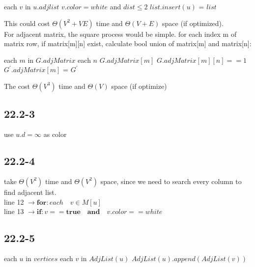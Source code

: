 \documentclass[]{article}
\begin{document}
\begin{codebox}
	
	\li \For each $v$ in $u.adjlist$
	\li 	\Do \If $v.color = white$ and $dist \le 2$ 
	\li			\Then $list.insert(u)$
	\li 		{}
	\End=
	\End
	\li \Return $list$
\end{codebox}

This could cost $\Theta(V^2 + VE)$ time and $\Theta(V+E)$ space (if optimized).\\

For adjacent matrix, the square process would be simple. for each index m of matrix row, if matrix[m][n] exist, calculate bool union of matrix[m] and matrix[n]:

\begin{codebox}
	
	\li \For each $m$ in $G.adjMatrix$
	\li \Do \For each $n$ $G.adjMatrix[m]$
	\li 	\Do \If $G.adjMatrix[m][n] == 1$
	\li         \Then $G^{'}.adjMatrix[m]$ = 
	\End
	\End
	\End
	\li \Return $G^{'}$
\end{codebox}

The  cost $\Theta(V^3)$ time and $\Theta(V)$ space (if optimize)

\subsection{22.2-3}
use $u.d = \infty$ as color

\subsection{22.2-4}
take $\Theta (V^2)$ time and $\Theta (V^2)$ space, since we need to search every column to find adjacent list.\\
line 12 $\rightarrow \textbf{for}: each \quad v \in M[u]$\\
line 13 $\rightarrow \textbf {if}: v == \textbf{true} \quad \textbf{and} \quad v.color == white $

\subsection{22.2-5}

\begin{codebox}
	
	\li \For each $u$ in $vertices$
	\li		\Do \For each $v$ in $AdjList(u)$
	\li 		\Do $AdjList(u).append(AdjList(v))$
	\End
	\End
\end{codebox}
\end{document}
